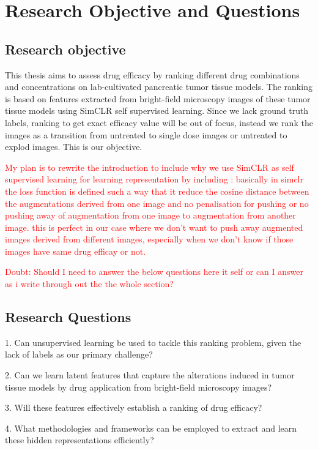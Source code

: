 \chapter{Research Objective and Questions}\label{ch:Research Objectives and Questions}
\section*{Research objective}
This thesis aims to assess drug efficacy by ranking different drug combinations and concentrations on lab-cultivated pancreatic tumor tissue models. 
The ranking is based on features extracted from bright-field microscopy images of these tumor tissue models using
SimCLR self supervised learning. Since we lack ground truth labels, ranking to get exact efficacy value will be out of focus, instead we rank the images as
a transition from untreated to single dose images or untreated to explod images. This is our objective.  


\textcolor{red}{My plan is to rewrite the introduction to include why we use SimCLR as self supervised learning for learning representation by including :
 basically in simclr the loss function is defined such a way that it reduce the cosine distance between the augmentations derived from one image  and no 
 penalisation for pushing or no pushing away of augmentation from one image to augmentation from another image. this is perfect in our case where 
 we don't want to push away augmented images derived from different images, especially when we don't know if those images have same drug efficay or not.}

\textcolor{red}{Doubt: Should I need to answer the below questions here it self or can I answer as i write through out the the whole section?}

\section*{Research Questions}
1. Can unsupervised learning be used to tackle this ranking problem, given the lack of labels as our primary challenge?

2. Can we learn latent features that capture the alterations induced in tumor tissue models by drug application from bright-field microscopy images?

3. Will these features effectively establish a ranking of drug efficacy?

4. What methodologies and frameworks can be employed to extract and learn these hidden representations efficiently?

